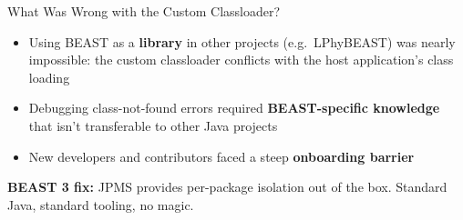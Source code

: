 \begin{frame}{What Was Wrong with the Custom Classloader?}
\begin{itemize}
\item Using BEAST as a \textbf{library} in other projects (e.g.\ LPhyBEAST) was nearly impossible: the custom classloader conflicts with the host application's class loading
\item Debugging class-not-found errors required \textbf{BEAST-specific knowledge} that isn't transferable to other Java projects
\item New developers and contributors faced a steep \textbf{onboarding barrier}
\end{itemize}

\vspace{1em}
\textbf{BEAST 3 fix:} JPMS  provides per-package isolation out of the box. Standard Java, standard tooling, no magic.
\end{frame}
